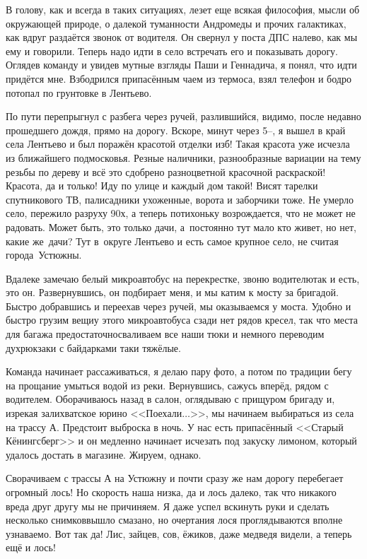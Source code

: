 В голову, как и всегда в таких ситуациях, лезет еще всякая философия, мысли об окружающей природе, о далекой туманности Андромеды и прочих галактиках, как вдруг раздаётся звонок от водителя. Он свернул у поста ДПС налево, как мы ему и говорили. Теперь надо идти в село встречать его и показывать дорогу. Оглядев команду и увидев мутные взгляды Паши и Геннадича, я понял, что идти придётся мне. Взбодрился припасённым чаем из термоса, взял телефон и бодро потопал по грунтовке в Лентьево. 
 
По пути перепрыгнул с разбега через ручей, разлившийся, видимо, после недавно прошедшего дождя, прямо на дорогу. Вскоре, минут через 5\thinspace\nobreakdash--, я вышел в край села Лентьево и был поражён красотой отделки изб! Такая красота уже исчезла из ближайшего подмосковья. Резные наличники, разнообразные вариации на тему резьбы по дереву и всё это сдобрено разноцветной красочной раскраской! Красота, да и только! Иду по улице и каждый дом такой! Висят тарелки спутникового ТВ, палисадники ухоженные, ворота и заборчики тоже. Не умерло село, пережило разруху 90\sdash х, а теперь потихоньку возрождается, что не может не радовать. Может быть, это только дачи, а~постоянно тут мало кто живет, но нет, какие же~дачи? Тут в~округе Лентьево и есть самое крупное село, не считая города~Устюжны.

Вдалеке замечаю белый микроавтобус на перекрестке, звоню водителю\mdash так и есть, это он. Развернувшись, он подбирает меня, и мы катим к мосту за бригадой. Быстро добравшись и переехав через ручей, мы оказываемся у моста. Удобно и быстро грузим вещи\mdash у этого микроавтобуса сзади нет рядов кресел, так что места для багажа предостаточно\mdash сваливаем все наши тюки и немного переводим дух\mdash рюкзаки с байдарками таки тяжёлые. 

Команда начинает рассаживаться, я делаю пару фото, а потом по традиции бегу на прощание умыться водой из реки. Вернувшись, сажусь вперёд, рядом с водителем. Оборачиваюсь назад в салон, оглядываю с прищуром бригаду и, изрекая залихватское юрино <<Поехали$\ldots$>>, мы начинаем выбираться из села на трассу А. Предстоит выброска в ночь. У нас есть припасённый <<Старый Кёнингсберг>> и он медленно начинает исчезать под закуску лимоном, который удалось достать в магазине. Жируем, однако.

Сворачиваем с трассы А на Устюжну и почти сразу же нам дорогу перебегает огромный лось! Но скорость наша низка, да и лось далеко, так что никакого вреда друг другу мы не причиняем. Я даже успел вскинуть руки и сделать несколько снимков\mdash вышло смазано, но очертания лося проглядываются вполне узнаваемо. Вот так да! Лис, зайцев, сов, ёжиков, даже медведя видели, а теперь ещё и лось! 

